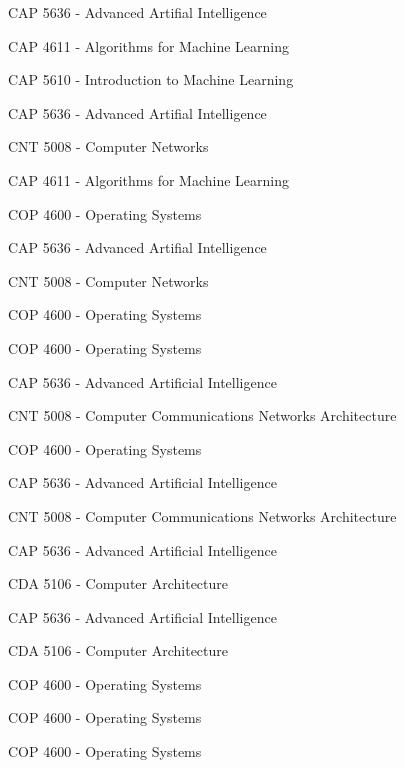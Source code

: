 
CAP 5636 - Advanced Artifial Intelligence

CAP 4611 - Algorithms for Machine Learning

CAP 5610 - Introduction to Machine Learning


CAP 5636 - Advanced Artifial Intelligence

CNT 5008 - Computer Networks

CAP 4611 - Algorithms for Machine Learning


COP 4600 - Operating Systems


CAP 5636 - Advanced Artifial Intelligence

CNT 5008 - Computer Networks


COP 4600 - Operating Systems


COP 4600 - Operating Systems

CAP 5636 - Advanced Artificial Intelligence

CNT 5008 - Computer Communications Networks Architecture



COP 4600 - Operating Systems



CAP 5636 - Advanced Artificial Intelligence

CNT 5008 - Computer Communications Networks Architecture



CAP 5636 - Advanced Artificial Intelligence

CDA 5106 - Computer Architecture


CAP 5636 - Advanced Artificial Intelligence

CDA 5106 - Computer Architecture


COP 4600 - Operating Systems


COP 4600 - Operating Systems


COP 4600 - Operating Systems


